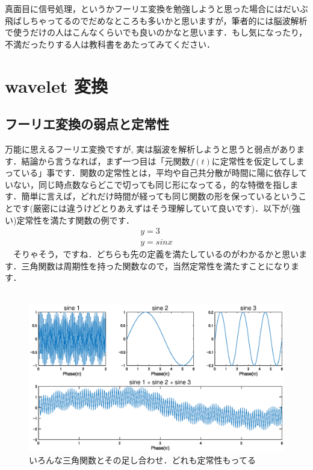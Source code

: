 \documentclass[11pt,a4paper]{ujreport} 	%
\begin{document}
真面目に信号処理，というかフーリエ変換を勉強しようと思った場合にはだいぶ飛ばしちゃってるのでだめなところも多いかと思いますが，筆者的には脳波解析で使うだけの人はこんなくらいでも良いのかなと思います．もし気になったり，不満だったりする人は教科書をあたってみてください．
\chapter{wavelet 変換}
\section{フーリエ変換の弱点と定常性}
万能に思えるフーリエ変換ですが, 実は脳波を解析しようと思うと弱点があります．結論から言うなれば，まず一つ目は「元関数$f(t)$に定常性を仮定してしまっている」事です．関数の定常性とは，平均や自己共分散が時間に陽に依存していない，同じ時点数ならどこで切っても同じ形になってる，的な特徴を指します．簡単に言えば，どれだけ時間が経っても同じ関数の形を保っているということです(厳密には違うけどとりあえずはそう理解していて良いです)．以下が(強い)定常性を満たす関数の例です．
\begin{eqnarray}
y = 3\\
y = sinx
\end{eqnarray}
　そりゃそう，ですね．どちらも先の定義を満たしているのがわかるかと思います．三角関数は周期性を持った関数なので，当然定常性を満たすことになります．\\ \\

\begin{figure}[H]
  \label{im:stat1}
  \centering
  \includegraphics[width=15cm]{../figures/stationarity1.eps}
  \caption{いろんな三角関数とその足し合わせ．どれも定常性もってる}
\end{figure}
\end{document}
